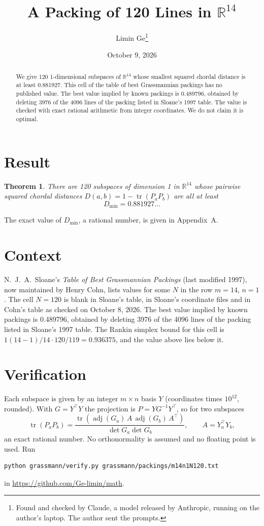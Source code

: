 \documentclass[11pt,a4paper]{article}
\title{A Packing of 120 Lines in $\mathbb{R}^{14}$}
\author{Limin Ge\thanks{Found and checked by Claude, a model released by Anthropic, running on the author's laptop. The author sent the prompts.}}
\date{October 9, 2026}
\newtheorem*{theorem}{Theorem}
\begin{document}
\maketitle
\begin{abstract}
We give 120 1-dimensional subspaces of $\mathbb{R}^{14}$ whose smallest squared chordal distance is at least 0.881927. This cell of the table of best Grassmannian packings has no published value. The best value implied by known packings is 0.489796, obtained by deleting 3976 of the 4096 lines of the packing listed in Sloane's 1997 table. The value is checked with exact rational arithmetic from integer coordinates. We do not claim it is optimal.
\end{abstract}

\section{Result}
\begin{theorem}
There are 120 subspaces of dimension 1 in $\mathbb{R}^{14}$ whose pairwise squared chordal distances $D(a,b) = 1 - \operatorname{tr}(P_aP_b)$ are all at least
\[ D_{\min} = 0.881927\ldots \]
\end{theorem}
The exact value of $D_{\min}$, a rational number, is given in Appendix~A.


\section{Context}
N.~J.~A.~Sloane's \emph{Table of Best Grassmannian Packings} (last modified 1997), now maintained by Henry Cohn, lists values for some $N$ in the row $m=14$, $n=1$. The cell $N=120$ is blank in Sloane's table, in Sloane's coordinate files and in Cohn's table as checked on October 8, 2026. The best value implied by known packings is 0.489796, obtained by deleting 3976 of the 4096 lines of the packing listed in Sloane's 1997 table. The Rankin simplex bound for this cell is $1(14-1)/14\cdot 120/119 = 0.936375$, and the value above lies below it.


\section{Verification}
Each subspace is given by an integer $m\times n$ basis $Y$ (coordinates times $10^{12}$, rounded). With $G=Y^\top Y$ the projection is $P=YG^{-1}Y^\top$, so for two subspaces
\[ \operatorname{tr}(P_aP_b)=\frac{\operatorname{tr}(\operatorname{adj}(G_a)\,A\,\operatorname{adj}(G_b)\,A^\top)}{\det G_a\det G_b},\qquad A=Y_a^\top Y_b, \]
an exact rational number. No orthonormality is assumed and no floating point is used. Run
\begin{verbatim}
python grassmann/verify.py grassmann/packings/m14n1N120.txt
\end{verbatim}
in \url{https://github.com/Ge-limin/math}.
\end{document}
